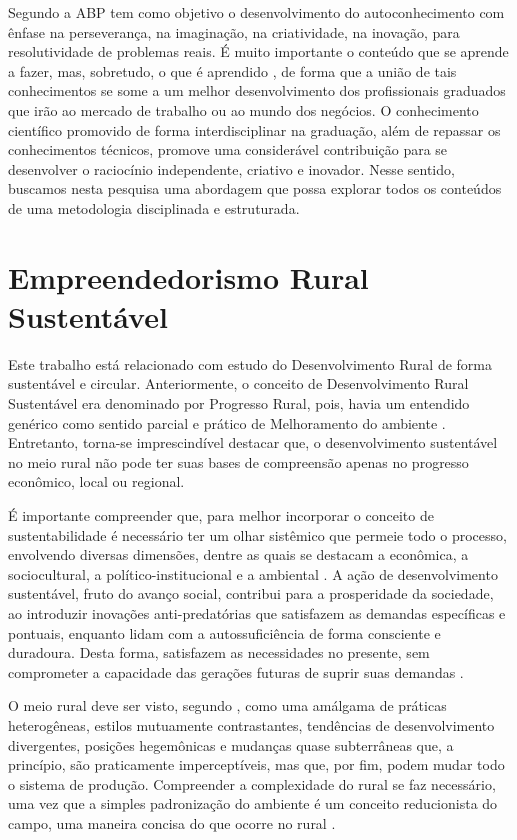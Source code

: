 Segundo  a ABP tem como objetivo o desenvolvimento do autoconhecimento com ênfase na perseverança, na imaginação, na criatividade, na inovação, para resolutividade de problemas reais. É muito importante o conteúdo que se aprende a fazer, mas, sobretudo, o que é aprendido \cite{souza_disseminacao_2001}, de forma que a união de tais conhecimentos se some a um melhor desenvolvimento dos profissionais graduados que irão ao mercado de trabalho ou ao mundo dos negócios. O conhecimento científico promovido de forma interdisciplinar na graduação, além de repassar os conhecimentos técnicos, promove uma considerável contribuição para se desenvolver o raciocínio independente, criativo e inovador. Nesse sentido, buscamos nesta pesquisa uma abordagem que possa explorar todos os conteúdos de uma metodologia disciplinada e estruturada.

\section{Empreendedorismo Rural Sustentável}

Este trabalho está relacionado com estudo do Desenvolvimento Rural de forma sustentável e circular. Anteriormente, o conceito de Desenvolvimento Rural Sustentável era denominado por Progresso Rural, pois, havia um entendido genérico como sentido parcial e prático de Melhoramento do ambiente \cite{almeida_da_1995}. Entretanto, torna-se imprescindível destacar que, o desenvolvimento sustentável no meio rural não pode ter suas bases de compreensão apenas no progresso econômico, local ou regional.

É importante compreender que, para melhor incorporar o conceito de sustentabilidade é necessário ter um olhar sistêmico que permeie todo o processo, envolvendo diversas dimensões, dentre as quais se destacam a econômica, a sociocultural, a político-institucional e a ambiental \cite{vieira_politica_2015}. A ação de desenvolvimento sustentável, fruto do avanço social, contribui para a prosperidade da sociedade, ao introduzir inovações anti-predatórias que satisfazem as demandas específicas e pontuais, enquanto lidam com a autossuficiência de forma consciente e duradoura. Desta forma, satisfazem as necessidades no presente, sem comprometer a capacidade das gerações futuras de suprir suas demandas \cite{onu_sustainable_2016}. 


O meio rural deve ser visto, segundo \cite{kageyama_desenvolvimento_2008}, como uma amálgama de práticas heterogêneas, estilos mutuamente contrastantes, tendências de desenvolvimento divergentes, posições hegemônicas e mudanças quase subterrâneas que, a princípio, são praticamente imperceptíveis, mas que, por fim, podem mudar todo o sistema de produção. Compreender a complexidade do rural se faz necessário, uma vez que a simples padronização do ambiente é um conceito reducionista do campo, uma maneira concisa do que ocorre no rural \cite{van_der_ploeg_trajetorias_2011}.

